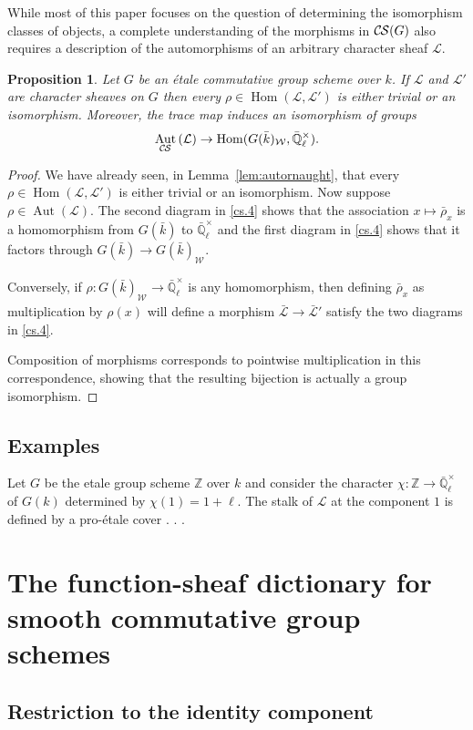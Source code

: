 \documentclass[10pt]{amsart}
\theoremstyle{plain}
\newtheorem{proposition}[theorem]{Proposition}
\theoremstyle{definition}
\theoremstyle{remark}
\newcommand{\ZZ}{{\mathbb{Z}}}
\newcommand{\EE}{\mathbb{\bar Q}_\ell}
\newcommand{\bFq}{\bar{k}}
\newcommand{\Fq}{k}
\newcommand{\EEx}{\EE^\times}
\newcommand{\Weil}[1]{\mathcal{W}_{#1}}
\DeclareMathOperator{\Aut}{Aut}
\DeclareMathOperator{\Hom}{Hom}
\newcommand{\cs}[1]{{\mathcal{#1}}}
\newcommand{\gcs}[1]{{\mathcal{\bar #1}}}
\newcommand{\CS}{{\mathcal{C\hskip-0.8pt S}}}
\newcommand{\brho}{{\bar\rho}}
\begin{document}
While most of this paper focuses on the question of determining the isomorphism classes of objects, a complete understanding of the morphisms in $\CS(G)$ also requires a description of the automorphisms of an arbitrary character sheaf $\cs{L}$.

\begin{proposition}\label{prop:autornaught_etale}
Let $G$ be an \'etale commutative group scheme over $\Fq$.
If $\cs{L}$ and $\cs{L}'$ are character sheaves on $G$ then
every $\rho\in \Hom(\cs{L},\cs{L}')$ is either trivial or an isomorphism. Moreover, the trace map induces an isomorphism of groups
\[
\Aut_\CS{}(\cs{L}) \to \Hom(G(\bFq)_{\Weil{}}, \EEx).
\]
\end{proposition}

\begin{proof}
We have already seen, in Lemma~\ref{lem:autornaught}, that every $\rho\in \Hom(\cs{L},\cs{L}')$ is either trivial or an isomorphism.
Now suppose $\rho \in \Aut(\cs{L})$.
The second diagram in \ref{cs.4} shows that the association $x \mapsto \brho_x$ is a homomorphism from $G(\bFq)$ to $\EEx$ and the first diagram in \ref{cs.4} shows that it factors through $G(\bFq) \to G(\bFq)_{\Weil{}}$.  

Conversely, if $\rho : G(\bFq)_{\Weil{}} \to \EEx$ is any homomorphism, then defining $\brho_x$ as multiplication by $\rho(x)$ will define a morphism $\gcs{L} \to \gcs{L}'$ satisfy the two diagrams in \ref{cs.4}.  

Composition of morphisms corresponds to pointwise multiplication in this correspondence, showing that the resulting bijection is actually a group isomorphism.
\end{proof}

\subsection{Examples}

Let $G$ be the etale group scheme $\ZZ$ over $\Fq$ and consider the character $\chi : \ZZ \to \EEx$ of $G(\Fq)$ determined by $\chi(1) = 1+\ell$.
The stalk of $\cs{L}$ at the component $1$ is defined
by a pro-\'etale cover  . . . 

\section{The function-sheaf dictionary for smooth commutative group schemes}\label{sec:main}


\subsection{Restriction to the identity component} \label{ssec:restriction}
\end{document}

